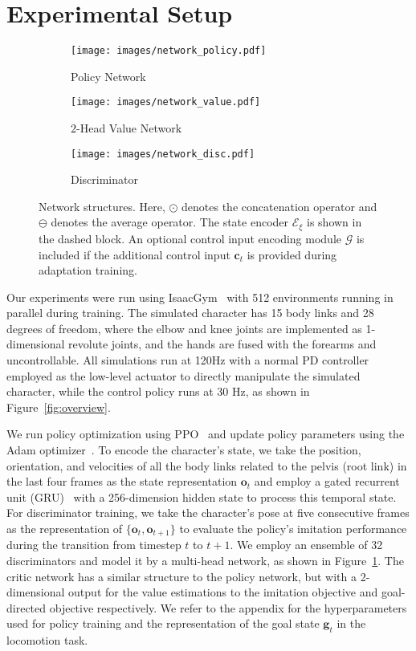 \section{Experimental Setup}\label{sec:setup}
\begin{figure}[t]
\centering
    \begin{subfigure}[t]{.3\linewidth}
    \texttt{[image: images/network\_policy.pdf]}
    \caption{Policy Network}
    \end{subfigure}\hfill
    \begin{subfigure}[t]{.36\linewidth}
    \hfill\texttt{[image: images/network\_value.pdf]}
    \caption{$2$-Head Value Network}
    \end{subfigure}\hfill
    \begin{subfigure}[t]{.3\linewidth}
    \centering
    \texttt{[image: images/network\_disc.pdf]}
    \caption{Discriminator}
    \end{subfigure}
    \caption{Network structures. Here, $\odot$ denotes the concatenation operator and $\ominus$ denotes the average operator. The state encoder $\mathcal{E}_\xi$ is shown in the dashed block. 
    An optional control input encoding module $\mathcal{G}$ is included if the additional control input $\mathbf{c}_t$ is provided during adaptation training.
    }
    \label{fig:network}
\end{figure}

Our experiments were run using %
IsaacGym~\cite{makoviychuk2021isaac} with 512 environments running in parallel during training. 
The simulated character has 15 body links and 28 degrees of freedom,
where the elbow and knee joints are implemented as 1-dimensional revolute joints, and the hands are fused with the forearms and uncontrollable.
All simulations run at 120Hz with a normal PD controller employed as the low-level 
actuator
to directly manipulate the simulated character, 
while the control policy runs at 30 Hz, as shown in Figure~\ref{fig:overview}.

We run policy optimization using PPO~\cite{schulman2017proximal} and update policy parameters using the Adam optimizer~\cite{kingma2014adam}.
To encode the character's state, %
we take the position, orientation, and velocities of all the body links related to the pelvis (root link) in the last four frames as the state representation $\mathbf{o}_t$ and employ a gated recurrent unit (GRU)~\cite{chung2014empirical} with a 256-dimension hidden state to process this temporal state.
For discriminator training, we take the character's pose at five consecutive frames as the representation of $\{\mathbf{o}_t, \mathbf{o}_{t+1}\}$ to evaluate the policy's imitation performance during the transition from timestep $t$ to $t+1$.
We employ an ensemble of 32 discriminators and model it by a multi-head network, as shown in Figure~\ref{fig:network}.
The critic network has a similar structure to the policy network, but with a 2-dimensional output for the value estimations to the imitation objective and goal-directed objective %
respectively. 
We refer to the appendix %
for the hyperparameters used for policy training and the representation of the goal state $\mathbf{g}_t$ in the locomotion task.


